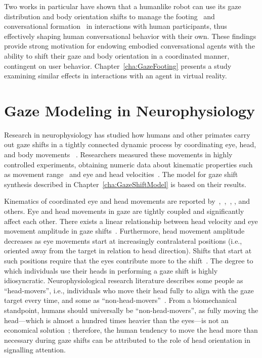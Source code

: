 Two works in particular have shown that a humanlike robot can use its gaze distribution and body orientation shifts to manage the footing~\citep{mutlu2012conversational} and conversational formation~\citep{kuzuoka2010reconfiguring} in interactions with human participants, thus effectively shaping human conversational behavior with their own. These findings provide strong motivation for endowing embodied conversational agents with the ability to shift their gaze and body orientation in a coordinated manner, contingent on user behavior. Chapter~\ref{cha:GazeFooting} presents a study examining similar effects in interactions with an agent in virtual reality.

\section{Gaze Modeling in Neurophysiology}

Research in neurophysiology has studied how humans and other primates carry out gaze shifts in a tightly connected dynamic process by coordinating eye, head, and body movements  ~\citep{zangemeister1982types,andredeshays1988eyehead1,barnes1979vor,freedman2000coordination,uemura1980eyehead,mccluskey2007monkeys}. Researchers measured these movements in highly controlled experiments, obtaining numeric data about kinematic properties such as movement range~\citep{guitton1987gaze} and eye and head velocities~\citep{guitton1987gaze,freedman2000coordination,barnes1979vor,uemura1980eyehead}. The model for gaze shift synthesis described in Chapter~\ref{cha:GazeShiftModel} is based on their results.

Kinematics of coordinated eye and head movements are reported by~\citet{guitton1987gaze},~\citet{freedman2000coordination},~\citet{barnes1979vor}, \citet{uemura1980eyehead}, and others. Eye and head movements in gaze are tightly coupled and significantly affect each other. There exists a linear relationship between head velocity and eye movement amplitude in gaze shifts~\citep{barnes1979vor,uemura1980eyehead}. Furthermore, head movement amplitude decreases as eye movements start at increasingly contralateral positions (i.e., oriented away from the target in relation to head direction). Shifts that start at such positions require that the eyes contribute more to the shift~\citep{mccluskey2007monkeys}. The degree to which individuals use their heads in performing a gaze shift is highly idiosyncratic. Neurophysiological research literature describes some people as ``head-movers'', i.e., individuals who move their head fully to align with the gaze target every time, and some as ``non-head-movers''~\citep{fuller1992head}. From a biomechanical standpoint, humans should universally be ``non-head-movers'', as fully moving the head---which is almost a hundred times heavier than the eyes---is not an economical solution~\citep{kim2007head}; therefore, the human tendency to move the head more than necessary during gaze shifts can be attributed to the role of head orientation in signalling attention.

